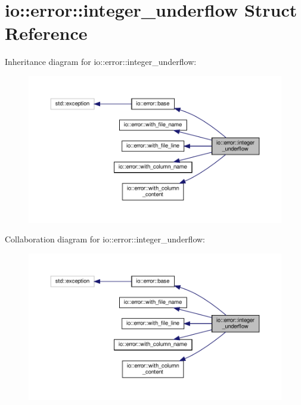 \hypertarget{structio_1_1error_1_1integer__underflow}{}\section{io\+:\+:error\+:\+:integer\+\_\+underflow Struct Reference}
\label{structio_1_1error_1_1integer__underflow}


Inheritance diagram for io\+:\+:error\+:\+:integer\+\_\+underflow\+:\nopagebreak
\begin{figure}[H]
\begin{center}
\leavevmode
\includegraphics[width=350pt]{structio_1_1error_1_1integer__underflow__inherit__graph}
\end{center}
\end{figure}


Collaboration diagram for io\+:\+:error\+:\+:integer\+\_\+underflow\+:\nopagebreak
\begin{figure}[H]
\begin{center}
\leavevmode
\includegraphics[width=350pt]{structio_1_1error_1_1integer__underflow__coll__graph}
\end{center}
\end{figure}
